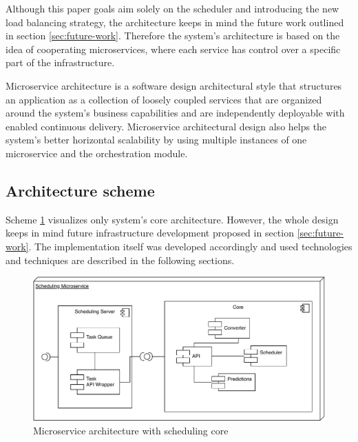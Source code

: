 Although this paper goals aim solely on the scheduler and introducing the new load balancing strategy,
the architecture keeps in mind the future work outlined in section \ref{sec:future-work}.
Therefore the system's architecture is based on the idea of cooperating microservices,
where each service has control over a specific part of the infrastructure. 

Microservice architecture is a software design architectural style 
that structures an application as a collection of loosely coupled services that are organized around the system's business capabilities\cite{namiot2014micro} 
and are independently deployable with enabled continuous delivery\cite{balalaie2016microservices}.
Microservice architectural design also helps the system's better horizontal scalability
by using multiple instances of one microservice 
and the orchestration module.

\subsection{Architecture scheme}\label{subsec:architecture-scheme}
Scheme \ref{fig:scheduling-core-arch} visualizes only system's core architecture. 
However,
the whole design keeps in mind future infrastructure development proposed in section \ref{sec:future-work}.
The implementation itself was developed accordingly 
and used technologies and techniques are described in the following sections.

\begin{figure}[ht]
    \includegraphics[width=\textwidth]{i_scheduler.pdf} 
    \centering
    \caption{Microservice architecture with scheduling core}
    \label{fig:scheduling-core-arch}
\end{figure}

